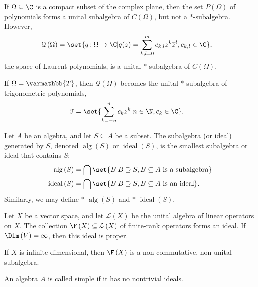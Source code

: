 \documentclass[10pt]{mypackage}
\renewcommand*{\mathbb}[1]{\varmathbb{#1}}
\begin{document}
\begin{example}
  If $\Omega\subseteq \C$ is a compact subset of the complex plane, then the set $P\left(\Omega\right)$ of polynomials forms a unital subalgebra of $C\left(\Omega\right)$, but not a $\ast$-subalgebra. However,
  \begin{align*}
    \mathcal{Q}\left(\Omega\right) &= \set{q\colon \Omega\rightarrow \C | q(z) = \sum_{k,l=0}^{m}c_{k,l}z^k \overline{z}^l,c_{k,l}\in \C},
  \end{align*}
  the space of Laurent polynomials, is a unital $\ast$-subalgebra of $C\left(\Omega\right)$.\newline

  If $\Omega = \mathbb{T}$, then $\mathcal{Q}\left(\Omega\right)$ becomes the unital $\ast$-subalgebra of trigonometric polynomials,
  \begin{align*}
    \mathcal{T} &= \set{\sum_{k=-n}^{n}c_kz^k | n\in \N,c_k\in \C}.
  \end{align*}
\end{example}
\begin{definition}
  Let $A$ be an algebra, and let $S\subseteq A$ be a subset. The subalgebra (or ideal) generated by $S$, denoted $\operatorname{alg}\left(S\right)$ or $\operatorname{ideal}\left(S\right)$, is the smallest subalgebra or ideal that contains $S$:
  \begin{align*}
    \operatorname{alg}\left(S\right) &= \bigcap\set{B | B\supseteq S,B\subseteq A\text{ is a subalgebra}}\\
    \operatorname{ideal}\left(S\right) &= \bigcap\set{B | B\supseteq S,B\subseteq A\text{ is an ideal}}.
  \end{align*}
  Similarly, we may define $\ast$-$\operatorname{alg}\left(S\right)$ and $\ast$-$\operatorname{ideal}\left(S\right)$.
\end{definition}
\begin{example}
  Let $X$ be a vector space, and let $\mathcal{L}\left(X\right)$ be the unital algebra of linear operators on $X$. The collection $\F\left(X\right)\subseteq \mathcal{L}\left(X\right)$ of finite-rank operators forms an ideal. If $\Dim\left(V\right) = \infty$, then this ideal is proper.\newline

  If $X$ is infinite-dimensional, then $\F\left(X\right)$ is a non-commutative, non-unital subalgebra.
\end{example}
\begin{definition}
  An algebra $A$ is called simple if it has no nontrivial ideals.
\end{definition}
\end{document}
